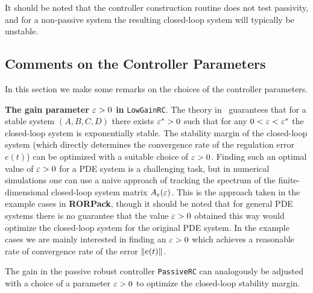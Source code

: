 \documentclass[11pt, a4paper]{amsart}
\newcommand{\COMMapproxRC}[1]{{\color{gray}#1}}
\renewcommand{\COMMapproxRC}[1]{}
\theoremstyle{definition}
\numberwithin{equation}{section}
\newcommand{\RORname}{\textbf{RORPack}}
\begin{document}
\begin{itemize}
It should be noted that the controller construction routine does not test passivity, and for a non-passive system the resulting closed-loop system will typically be unstable.

	\bigskip

     \COMMapproxRC{
     \item An ``approximate robust controller'' based on the reference~\cite{HumKur19} for finite-dimensional approximate control design for systems with infinite-dimensional output spaces.\\[1ex]
	 Calling sequence for the construction:\\[-1ex]
	   \begin{quotation}
	     \texttt{ApproximateRC(\dots)}
	   \end{quotation}
	 }
\end{itemize}

\subsection{Comments on the Controller Parameters}
\label{sec:ContrParameterComments}

In this section we make some remarks on the choices of the controller parameters.

\textbf{The gain parameter $\varepsilon>0$ in }\texttt{LowGainRC}. 
The theory in~\cite{HamPoh00,RebWei03} guarantees that for a stable system $(A,B,C,D)$ there exists $\varepsilon^\ast>0$ such that for any $0<\varepsilon<\varepsilon^\ast$ the closed-loop system is exponentially stable. The stability margin of the closed-loop system (which directly determines the convergence rate of the regulation error $e(t)$) can be optimized with a suitable choice of $\varepsilon>0$. Finding such an optimal value of $\varepsilon>0$ for a PDE system is a challenging task, but in numerical simulations one can use a naive approach of tracking the spectrum of the finite-dimensional closed-loop system matrix $A_e(\varepsilon)$. This is the approach taken in the example cases in \RORname, though it should be noted that for general PDE systems there is no guarantee that the value $\varepsilon>0$ obtained this way would optimize the closed-loop system for the original PDE system. 
In the example cases we are mainly interested in finding an $\varepsilon>0$ which achieves a reasonable rate of convergence rate of the error $\lVert e(t)\rVert$.

The gain in the passive robust controller \texttt{PassiveRC} can analogously be adjusted with a choice of a parameter $\varepsilon>0$ to optimize the closed-loop stability margin.
\end{document}
